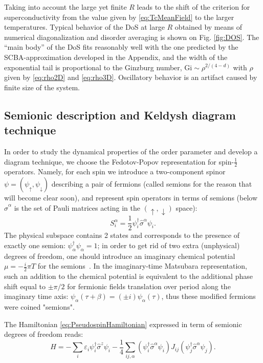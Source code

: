\documentclass[twocolumn,english,prb]{revtex4-1}
\begin{document}
Taking into account the large yet finite $R$ leads to the shift of the criterion for superconductivity from the value given by \eqref{eq:TcMeanField} to the larger temperatures. Typical behavior of the DoS at large $R$ obtained by means of numerical diagonalization and disorder averaging is shown on Fig. \ref{fig:DOS}. The ``main body'' of the DoS fits reasonably well with the one predicted by the SCBA-approximation developed in the Appendix, and the width of the exponential tail is proportional to the Ginzburg number, $\mathrm{Gi} \sim \rho^{2 / (4 - d)}$ with $\rho$ given by \eqref{eq:rho2D} and \eqref{eq:rho3D}. Oscillatory behavior is an artifact caused by finite size of the system.

\subsection{Semionic description and Keldysh diagram technique}
\label{sec:KeldyshTechnique}
In order to study the dynamical properties of the order parameter and develop a diagram technique, we choose the Fedotov-Popov representation for spin-$\frac{1}{2}$ operators\cite{FedotovPopov,Shtyk}. Namely, for each spin we introduce a two-component spinor $\psi = (\psi_{\uparrow}, \psi_{\downarrow})$ describing a pair of fermions (called semions for the reason that will become clear soon), and represent spin operators in terms of semions (below $\hat{\sigma}^\alpha$ is the set of Pauli matrices
acting in the $({\uparrow},{\downarrow})$ space):
\begin{equation}
S^\alpha_{i} = \frac{1}{2} \psi^\dagger_{i}\hat{\sigma}^\alpha \psi_i.
\end{equation}
The physical subspace contains 2 states and corresponds to the presence of exactly one  semion: 
$\psi^\dagger_\alpha \psi_\alpha = 1$; in order to get rid of two extra (unphysical)  degrees of freedom, one should  introduce an imaginary chemical potential $\mu = -\frac{i}{2} \pi T$  for the semions~\cite{FedotovPopov}. In the imaginary-time Matsubara representation, such an addition to the chemical potential is equivalent to the  additional phase shift equal to $\pm \pi/2$ for
fermionic fields translation over period along the imaginary time axis:
 $\psi_\alpha (\tau + \beta) =  ( \pm i) \psi_\alpha (\tau)$, thus these modified fermions were coined "semions".

 The Hamiltonian \eqref{eq:PseudospinHamiltonian} expressed in term of semionic degrees of freedom reads:
\begin{equation}
\label{eq:SemionHamitlonian}
H=-\sum_{i}\varepsilon_{i}\psi_{i}^{\dagger}\hat{\sigma}^{z}\psi_{i}-\frac{1}{4}\sum_{ij,\alpha}(\psi_{i}^{\dagger}\hat{\sigma}^{\alpha}\psi_{i})J_{ij}(\psi_{j}^{\dagger}\hat{\sigma}^{\alpha}\psi_{j}).
\end{equation}
\end{document}
